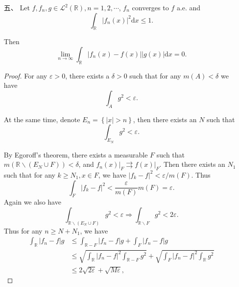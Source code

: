 \begin{itemize}
\begin{proof}
    (2) 考虑$f(x)=\sum\limits_{n=2}^\infty n\chi_{E_n}$，
    其中$E_n$是互不相交、长度为$\frac{1}{10n^3}$的区间。
    显然有$f\not\in L^2([0,1])$，下证明$f$满足题设性质。
    对Borel可测集$E$，不妨假设$m(E) \leq \sum\limits_{n=2}^\infty m(E_n)$，
    否则去掉$\{f = 0\}$后，等式左边不变而右边减小。\\
    记$N \in \mathbb{N}$使得$\sum\limits_{n=N}^\infty m(E_n) \geq m(E)$
    且$\sum\limits_{n=N+1}^\infty m(E_n) < m(E)$。
    此时\[\int_E f \leq N\left(m(E)-\sum_{n=N+1}^\infty \frac{1}{10n^3}\right) 
    + \sum_{n=N+1}^\infty \frac{1}{10n^2}.\]
    我们希望有
    \[N\left(m(E)-\sum_{n=N+1}^\infty \frac{1}{10n^3}\right) 
    + \sum_{n=N+1}^\infty \frac{1}{10n^2} \leq \sqrt{m(E)},\]
    由二次函数的性质只需要对$m(E)$趋于$\sum\limits_{n=N}^\infty m(E_n)$
    和$\sum\limits_{n=N+1}^\infty m(E_n)$时验证不等式，即验证
    \[\sum_{n=N}^\infty \frac{1}{10n^2} 
    \leq \sqrt{\sum_{n=N}^\infty \frac{1}{10n^3}}\]
    对任意$N\geq 2$成立。

    对左右两边用积分放缩，$\text{LHS} \leq \frac{1}{10(N-1)},\text{RHS} \ge \sqrt{\frac{1}{20N^2}}$，而
    \[\frac{1}{10(N-1)} \leq \sqrt{\frac{1}{20N^2}} 
    \iff N^2 \leq 5(N-1)^2 \iff \left(1-\frac{1}{N}\right)^2 \geq \frac{1}{5},\]
    这是显然的。
\end{proof}


\item[五、]
Let $ f,f_{n},g\in \mathcal{L} ^{2}(\mathbb{R} ),n=1,2,\cdots $, $ f_{n} $ converges to $ f $ a.e. and
$$\int_{\mathbb{R}}|f_n(x)|^2\mathrm{d} x\le 1.$$

Then
$$\lim_{n\rightarrow \infty}\int_{\mathbb{R}}|f_n(x)-f(x)||g (x)|\mathrm{d}x=0.$$

\begin{proof}
	For any $ \varepsilon> 0 $, there exists a $ \delta>0 $ such that for any $ m(A)<\delta $ we have
	$$
		\int_A{g^2}<\varepsilon.
	$$


	At the same time, denote $E_n=\left\{ |x|>n \right\}$, then there exists an $N$ such that
	$$\int_{E_N}{g^2}<\varepsilon.$$

	By Egoroff's theorem, there exists a measurable $F$ such that $ m(\mathbb{R} \backslash (E_{N}\cup F))<\delta $, 
    and $ f_{n}(x)\vert_{F}\rightrightarrows f(x)\vert_{F} $. 
    Then there exists an $ N_{1} $ such that for any $k\ge N_{1},x\in F$, 
    we have $|f_{k}-f|^{2}<\varepsilon/m(F)$. Thus
	$$\int_F{|f_k-f|^2}<\frac{\varepsilon}{m(F)}m(F) =\varepsilon.$$
	Again we also have
	$$\int_{\mathbb{R} \backslash (E_{N}\cup F)}^{}{g^2}<\varepsilon 
    \Rightarrow \int_{\mathbb{R} \backslash F}{g^2}<2\varepsilon.$$
	Thus for any $ n\ge N+N_{1} $, we have
	\begin{align*}
        \int_{\mathbb{R}}{|f_n-f|g}&\le \int_{\mathbb{R}-F}{|f_n-f|g}+\int_F{|f_n-f|g}\\
        &\le \sqrt{\int_{\mathbb{R}}{|f_n-f|^2}\int_{\mathbb{R}-F}{g^2}}+\sqrt{\int_F{|f_n-f|^2}\int_{\mathbb{R}}{g^2}}\\
        &\le 2\sqrt{2\varepsilon}+\sqrt{M\varepsilon},
    \end{align*}


\end{proof}
\end{itemize}
